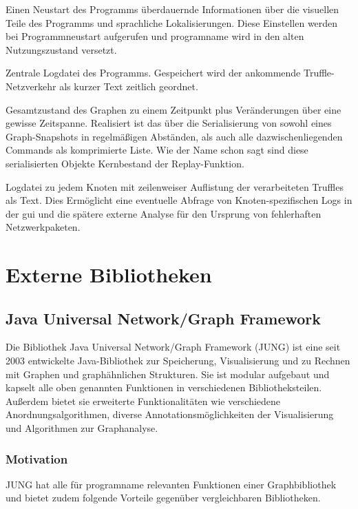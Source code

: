 \begin{description}[style=multiline, leftmargin=3.3cm, labelwidth=3.3cm]
\item[\texttt{config}] Einen Neustart des Programms überdauernde Informationen über die visuellen Teile des Programms und sprachliche Lokalisierungen. Diese Einstellen werden bei Programmneustart aufgerufen und \gls{programname} wird in den alten Nutzungszustand versetzt.
\item[\texttt{log}] Zentrale Logdatei des Programms. Gespeichert wird der ankommende Truffle-Netzverkehr als kurzer Text zeitlich geordnet.
\item[\texttt{replay\_log}] Gesamtzustand des Graphen zu einem Zeitpunkt plus Veränderungen über eine gewisse Zeitspanne. Realisiert ist das über die Serialisierung von sowohl eines Graph-Snapshots in regelmäßigen Abständen, als auch alle dazwischenliegenden Commands als komprimierte Liste. Wie der Name schon sagt sind diese serialisierten Objekte Kernbestand der Replay-Funktion.
\item[\texttt{truffle\_data\_log}] Logdatei zu jedem Knoten mit zeilenweiser Auflistung der verarbeiteten Truffles als Text. Dies Ermöglicht eine eventuelle Abfrage von Knoten-spezifischen Logs in der \gls{gui} und die spätere externe Analyse für den Ursprung von fehlerhaften Netzwerkpaketen.
\end{description}

\section{Externe Bibliotheken}
\subsection{Java Universal Network/Graph Framework}
Die Bibliothek Java Universal Network/Graph Framework (JUNG) ist eine seit 2003 entwickelte Java-Bibliothek zur Speicherung, Visualisierung und zu Rechnen mit Graphen und graphähnlichen Strukturen. Sie ist modular aufgebaut und kapselt alle oben genannten Funktionen in verschiedenen Bibliotheksteilen. Außerdem bietet sie erweiterte Funktionalitäten wie verschiedene Anordnungsalgorithmen, diverse Annotationsmöglichkeiten der Visualisierung und Algorithmen zur Graphanalyse.
\subsubsection{Motivation}
JUNG hat alle für \gls{programname} relevanten Funktionen einer Graphbibliothek und bietet zudem folgende Vorteile gegenüber vergleichbaren Bibliotheken.

